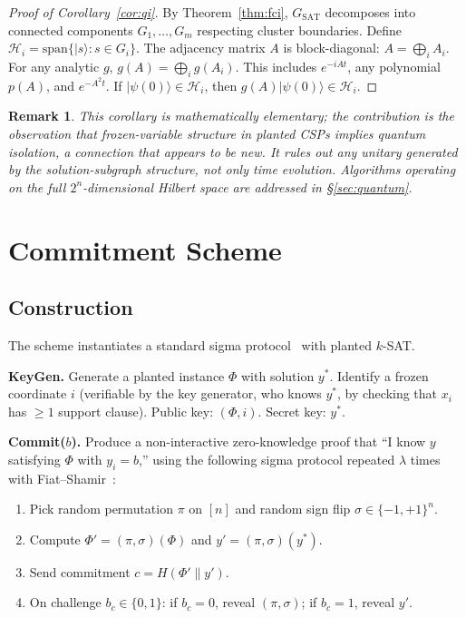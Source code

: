 \documentclass[11pt]{article}
\newtheorem{remark}[theorem]{Remark}
\begin{document}
\begin{proof}[Proof of Corollary~\ref{cor:qi}]
By Theorem~\ref{thm:fci}, $G_{\mathrm{SAT}}$ decomposes into connected components $G_1, \ldots, G_m$ respecting cluster boundaries.  Define $\mathcal{H}_i = \mathrm{span}\{|s\rangle : s \in G_i\}$.  The adjacency matrix $A$ is block-diagonal: $A = \bigoplus_i A_i$.  For any analytic $g$, $g(A) = \bigoplus_i g(A_i)$.  This includes $e^{-iAt}$, any polynomial $p(A)$, and $e^{-A^2 t}$.  If $|\psi(0)\rangle \in \mathcal{H}_i$, then $g(A)|\psi(0)\rangle \in \mathcal{H}_i$.
\end{proof}

\begin{remark}
This corollary is mathematically elementary; the contribution is the observation that frozen-variable structure in planted CSPs implies quantum isolation, a connection that appears to be new.  It rules out any unitary generated by the solution-subgraph structure, not only time evolution.  Algorithms operating on the full $2^n$-dimensional Hilbert space are addressed in \S\ref{sec:quantum}.
\end{remark}


\section{Commitment Scheme}

\subsection{Construction}

The scheme instantiates a standard sigma protocol~\cite{GMW91} with planted $k$-SAT.

\medskip\noindent\textbf{KeyGen.}  Generate a planted instance $\Phi$ with solution $y^*$.  Identify a frozen coordinate $i$ (verifiable by the key generator, who knows $y^*$, by checking that $x_i$ has $\geq 1$ support clause).  Public key: $(\Phi, i)$.  Secret key: $y^*$.

\medskip\noindent\textbf{Commit($b$).}  Produce a non-interactive zero-knowledge proof that ``I know $y$ satisfying $\Phi$ with $y_i = b$,'' using the following sigma protocol repeated $\lambda$ times with Fiat--Shamir~\cite{FS86}:
\begin{enumerate}
\item Pick random permutation $\pi$ on $[n]$ and random sign flip $\sigma \in \{-1,+1\}^n$.
\item Compute $\Phi' = (\pi, \sigma)(\Phi)$ and $y' = (\pi, \sigma)(y^*)$.
\item Send commitment $c = H(\Phi' \| y')$.
\item On challenge $b_c \in \{0,1\}$: if $b_c = 0$, reveal $(\pi,\sigma)$; if $b_c = 1$, reveal $y'$.
\end{enumerate}
\end{document}
